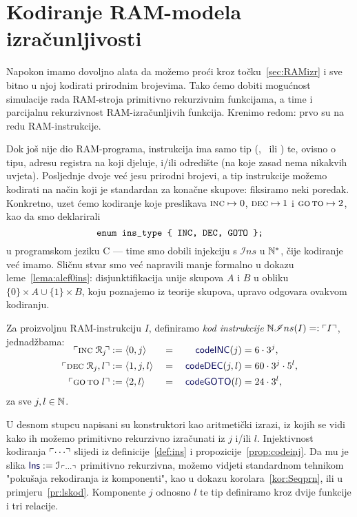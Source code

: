\section{Kodiranje RAM-modela izračunljivosti}

Napokon imamo dovoljno alata da možemo proći kroz točku~\ref{sec:RAMizr} i sve bitno u njoj kodirati prirodnim brojevima. Tako ćemo dobiti mogućnost simulacije rada RAM-stroja primitivno rekurzivnim funkcijama, a time i parcijalnu rekurzivnost RAM-izračunljivih funkcija. Krenimo redom: prvo su na redu RAM-instrukcije.


Dok još nije dio RAM-programa, instrukcija ima samo tip (\inc, \dec\ ili \goto) te, ovisno o tipu, adresu registra na koji djeluje, i\slash ili odredište (na koje zasad nema nikakvih uvjeta). Posljednje dvoje već jesu prirodni brojevi, a tip instrukcije možemo kodirati na način koji je standardan za konačne skupove: fiksiramo neki poredak. Konkretno, uzet ćemo kodiranje koje preslikava $\textsc{inc}\mapsto0$, $\textsc{dec}\mapsto\mspace{-1mu}1$ i $\textsc{go\,to}\mapsto2$, kao da smo deklarirali
\begin{equation}\label{eq:enumIns}
\texttt{enum ins\_type \string{ INC, DEC, GOTO \string};}
\end{equation}
u programskom jeziku C --- time smo dobili injekciju s $\mathscr Ins$ u ${\mathbb N}^*$, čije kodiranje već imamo. Sličnu stvar smo već napravili manje formalno u dokazu leme~\ref{lema:alef0ins}: disjunktifikacija unije skupova $A$ i $B$ u obliku $\{0\}\times A\cup\{1\}\times B$, koju poznajemo iz teorije skupova, upravo odgovara ovakvom kodiranju.

\begin{definicija}[{name=[kodiranje skupa $\mathscr Ins$]}]\label{def:kodIns}
    Za proizvoljnu RAM-instrukciju $I$, definiramo \emph{kod instrukcije} ${\mathbb N}\mathscr Ins(I)=:\ulcorner I\urcorner$, jednadžbama:
\begin{alignat*}{3}
\SwapAboveDisplaySkip
    \kins{\incr j\!}&:=\langle0,j\rangle&\;=\;&&\f{codeINC}(j)&=6\cdot3^j\text,\\
    \kins{\decr jl}&:=\langle1,j,l\rangle&\;=\;&&\f{codeDEC}(j,l)&=60\cdot3^j\cdot5^l\text,\\
    \kins{\goto\;l}&:=\langle2,l\rangle&\;=\;&&\f{codeGOTO}(l)&=24\cdot3^l\text,
\end{alignat*}
za sve $j,l\in{\mathbb N}$.
\end{definicija}
U desnom stupcu napisani su konstruktori kao aritmetički izrazi, iz kojih se vidi kako ih možemo primitivno rekurzivno izračunati iz $j$ i\slash ili $l$. Injektivnost kodiranja $\ulcorner\cdots\urcorner$ slijedi iz definicije~\ref{def:ins} i propozicije~\ref{prop:codeinj}. Da mu je slika $\f{Ins}:=\im{\,\kins{\cdots}}$ primitivno rekurzivna, možemo vidjeti standardnom tehnikom "pokušaja rekodiranja iz komponenti", kao u dokazu korolara~\ref{kor:Seqprn}, ili u primjeru~\ref{pr:lskod}.
Komponente $j$ odnosno $l$ te tip definiramo kroz dvije funkcije i tri relacije.

